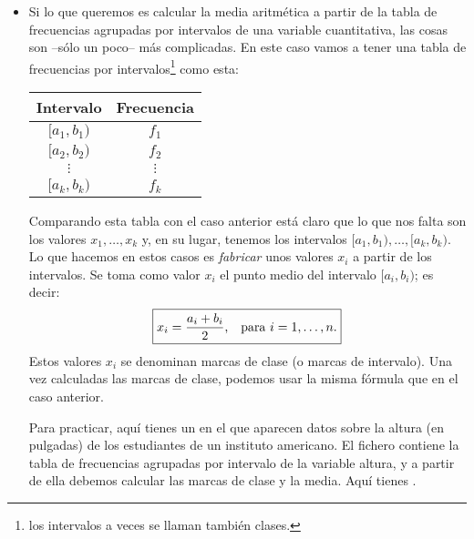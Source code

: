 \begin{itemize}
    \item Si lo que queremos es calcular la {\sf media aritmética a partir de la tabla de frecuencias agrupadas por intervalos de una variable cuantitativa}, las cosas son --sólo un poco-- más complicadas. En este caso vamos a tener una tabla de frecuencias por intervalos\footnote{los intervalos a veces se llaman también {\sf clases}.} como esta:
        \begin{center}
        \begin{tabular}{|c|c|}
        \hline
        \rule{0cm}{4mm}{\bf Intervalo}&{\bf Frecuencia}\\ \hline
        \rule{0cm}{4mm}$[a_1,b_1)$&$f_1$\\[2mm] \hline
        \rule{0cm}{4mm}$[a_2,b_2)$&$f_2$\\[2mm] \hline
        $\vdots$&$\vdots$\\[2mm] \hline
        \rule{0cm}{4mm}$[a_k,b_k)$&$f_k$\\[2mm] \hline
        \end{tabular}
        \end{center}
        Comparando esta tabla con el caso anterior está claro que lo que nos falta son los valores $x_1,\ldots,x_k$ y, en su lugar, tenemos los intervalos $[a_1,b_1),\ldots,[a_k,b_k)$. Lo que hacemos en estos casos es {\em fabricar} unos valores $x_i$ a partir de los intervalos. Se toma como valor $x_i$ el punto medio del intervalo $[a_i,b_i)$; es decir:
        \[\fbox{$x_i=\dfrac{a_i+b_i}{2}$,\quad para $i=1,\ldots,n.$}\]
        Estos valores $x_i$ se denominan {\sf marcas de clase} (o marcas de intervalo). Una vez calculadas las marcas de clase, podemos usar la misma fórmula que en el caso anterior.

        Para practicar, aquí tienes un   en el que aparecen datos sobre la altura (en pulgadas) de los estudiantes de un instituto americano.  El fichero contiene la tabla de frecuencias agrupadas por intervalo de la variable altura, y a partir de ella debemos calcular las marcas de clase y la media. Aquí tienes .
\end{itemize}


%


